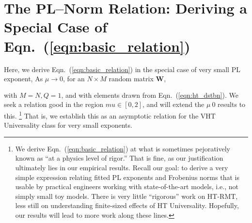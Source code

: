 

\newpage


\section{The PL--Norm Relation: Deriving a Special Case of Eqn.~(\ref{eqn:basic_relation})}
\label{sxn:appendix-derivation-pl-norm-relation}

Here, we derive Eqn.~(\ref{eqn:basic_relation}) in the special case of very small PL exponent, 
As 
$\mu \rightarrow 0$, 
for an $N \times M$ random matrix $\mathbf{W}$, {with $M=N, Q=1$, and with elements drawn from Eqn.~(\ref{eqn:ht_dstbn}).%
We seek a relation good in the region $mu\in[0,2]$, and will extend the $\mu~0$ results to this.
\footnote{We derive Eqn.~(\ref{eqn:basic_relation}) at what is sometimes pejoratively known as ``at a physics level of rigor.''  That is fine, as our justification ultimately lies in our empirical results.  Recall our goal: to derive a very simple expression relating fitted PL exponents and Frobenius norms that is usable by practical engineers working with state-of-the-art models, i.e., not simply small toy models.  There is very little ``rigorous'' work on HT-RMT, less still on understanding finite-sized effects of HT Universality.  Hopefully, our results will lead to more work along these lines.  }
That is, we establish this as an asymptotic relation for the VHT Universality class for very small exponents.

}
